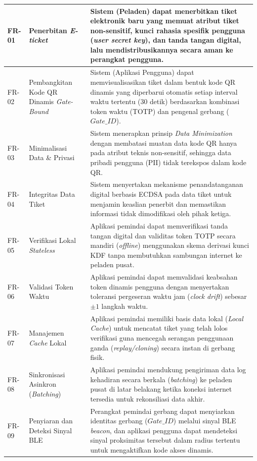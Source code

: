 \begin{longtable}{|l|p{4.5cm}|p{7.5cm}|}
    FR-01 & Penerbitan \textit{E-ticket} & Sistem (Peladen) dapat menerbitkan tiket elektronik baru yang memuat atribut tiket non-sensitif, kunci rahasia spesifik pengguna (\textit{user secret key}), dan tanda tangan digital, lalu mendistribusikannya secara aman ke perangkat pengguna. \\
    \hline
    FR-02 & Pembangkitan Kode QR Dinamis \textit{Gate-Bound} & Sistem (Aplikasi Pengguna) dapat memvisualisasikan tiket dalam bentuk kode QR dinamis yang diperbarui otomatis setiap interval waktu tertentu (30 detik) berdasarkan kombinasi token waktu (TOTP) dan pengenal gerbang ($Gate\_ID$). \\
    \hline
    FR-03 & Minimalisasi Data \& Privasi & Sistem menerapkan prinsip \textit{Data Minimization} dengan membatasi muatan data kode QR hanya pada atribut teknis non-sensitif, sehingga data pribadi pengguna (PII) tidak terekspos dalam kode QR. \\
    \hline
    FR-04 & Integritas Data Tiket & Sistem menyertakan mekanisme penandatanganan digital berbasis ECDSA pada data tiket untuk menjamin keaslian penerbit dan memastikan informasi tidak dimodifikasi oleh pihak ketiga. \\
    \hline
    FR-05 & Verifikasi Lokal \textit{Stateless} & Aplikasi pemindai dapat memverifikasi tanda tangan digital dan validitas token TOTP secara mandiri (\textit{offline}) menggunakan skema derivasi kunci KDF tanpa membutuhkan sambungan internet ke peladen pusat. \\
    \hline
    FR-06 & Validasi Token Waktu & Aplikasi pemindai dapat memvalidasi keabsahan token dinamis pengguna dengan menyertakan toleransi pergeseran waktu jam (\textit{clock drift}) sebesar $\pm 1$ langkah waktu. \\
    \hline
    FR-07 & Manajemen \textit{Cache} Lokal & Aplikasi pemindai memiliki basis data lokal (\textit{Local Cache}) untuk mencatat tiket yang telah lolos verifikasi guna mencegah serangan penggunaan ganda (\textit{replay/cloning}) secara instan di gerbang fisik. \\
    \hline
    FR-08 & Sinkronisasi Asinkron (\textit{Batching}) & Aplikasi pemindai mendukung pengiriman data log kehadiran secara berkala (\textit{batching}) ke peladen pusat di latar belakang ketika koneksi internet tersedia untuk rekonsiliasi data akhir. \\
    \hline
    FR-09 & Penyiaran dan Deteksi Sinyal BLE & Perangkat pemindai gerbang dapat menyiarkan identitas gerbang ($Gate\_ID$) melalui sinyal BLE \textit{beacon}, dan aplikasi pengguna dapat mendeteksi sinyal proksimitas tersebut dalam radius tertentu untuk mengaktifkan kode akses dinamis. \\
    \hline

\end{longtable}

